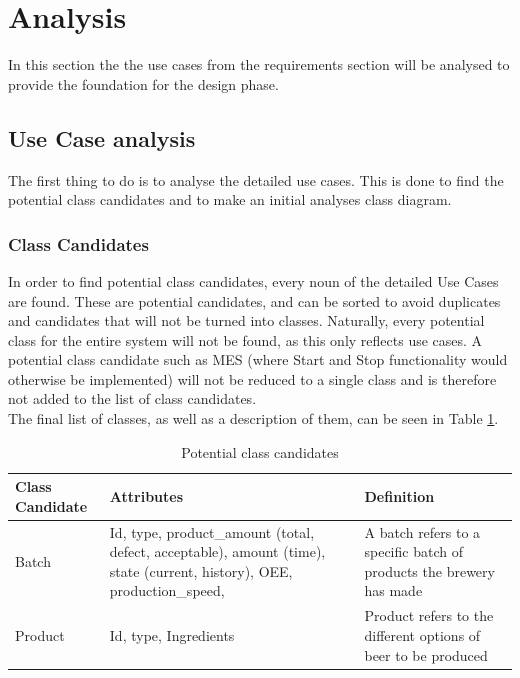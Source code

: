 \section{Analysis}
In this section the the use cases from the requirements section will be analysed
to provide the foundation for the design phase.

\subsection{Use Case analysis}
The first thing to do is to analyse the detailed use cases. This is done to find
the potential class candidates and to make an initial analyses class diagram.

\subsubsection{Class Candidates}
In order to find potential class candidates, every noun of the detailed Use
Cases are found. These are potential candidates, and can be sorted to avoid
duplicates and candidates that will not be turned into classes. Naturally, every
potential class for the entire system will not be found, as this only reflects
use cases. A potential class candidate such as MES (where Start and Stop
functionality would otherwise be implemented) will not be reduced to a single
class and is therefore not added to the list of class candidates.\\

The final list of classes, as well as a description of them, can be seen in
Table \ref{table:class_candidates}.

\begin{table}[ht]
    \begin{tabularx}{\textwidth}{|>{\RaggedRight}p{4cm}|>{\RaggedRight}p{6cm}|>{\RaggedRight}X|}
    \hline
    \textbf{Class Candidate} & \textbf{Attributes}                                                                                                     & \textbf{Definition}                                                                    \\ \hline
    Batch                    & Id, type, product\_amount (total, defect, acceptable), amount (time), state (current, history), OEE, production\_speed, & A batch refers to a specific batch of products the brewery has made                    \\ \hline
    Product                  & Id, type, Ingredients                                                                                                  & Product refers to the different options of beer to be produced                         \\ \hline
    \end{tabularx}
    \caption{Potential class candidates}
    \label{table:class_candidates}
    \end{table}

